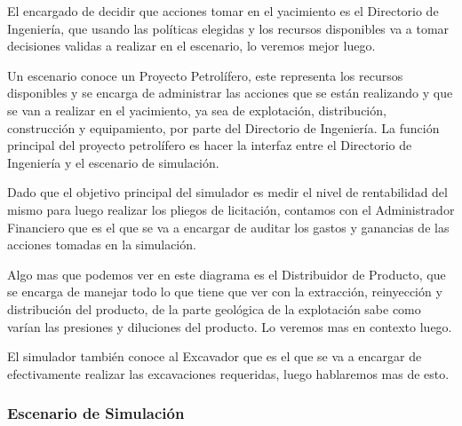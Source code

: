 \documentclass[10pt,a4paper]{article}
\begin{document}
El encargado de decidir que acciones tomar en el yacimiento es el Directorio de Ingeniería, que usando las políticas elegidas y los recursos disponibles va a tomar decisiones validas a realizar en el escenario, lo veremos mejor luego.

Un escenario conoce un Proyecto Petrolífero, este representa los recursos disponibles y se encarga de administrar las acciones que se están realizando y que se van a realizar en el yacimiento, ya sea de explotación, distribución, construcción y equipamiento, por parte del Directorio de Ingeniería. La función principal del proyecto petrolífero es hacer la interfaz entre el Directorio de Ingeniería y el escenario de simulación.

Dado que el objetivo principal del simulador es medir el nivel de rentabilidad del mismo para luego realizar los pliegos de licitación, contamos con el Administrador Financiero que es el que se va a encargar de auditar los gastos y ganancias de las acciones tomadas en la simulación.

Algo mas que podemos ver en este diagrama es el Distribuidor de Producto, que se encarga de manejar todo lo que tiene que ver con la extracción, reinyección y distribución del producto, de la parte geológica de la explotación sabe como varían las presiones y diluciones del producto. Lo veremos mas en contexto luego.

El simulador también conoce al Excavador que es el que se va a encargar de efectivamente realizar las excavaciones requeridas, luego hablaremos mas de esto.

\subsubsection{Escenario de Simulación}
\end{document}

